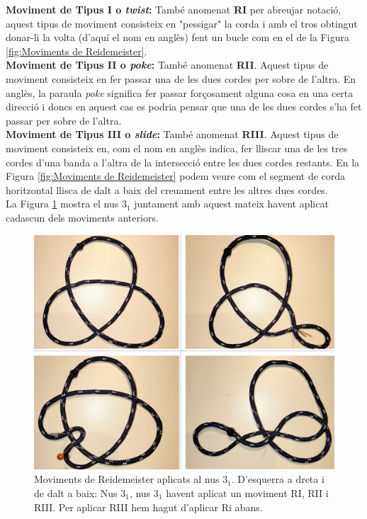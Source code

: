 \noindent
\textbf{Moviment de Tipus I o \textit{twist}:} També anomenat \textbf{RI} per abreujar notació, aquest tipus de moviment consisteix en "pessigar" la corda i amb el tros obtingut donar-li la volta (d'aquí el nom en anglès) fent un bucle com en el de la Figura \ref{fig:Moviments de Reidemeister}.\\

\noindent
\textbf{Moviment de Tipus II o \textit{poke}:} També anomenat \textbf{RII}. Aquest tipus de moviment consisteix en fer passar una de les dues cordes per sobre de l'altra. En anglès, la paraula \textit{poke} significa fer passar forçosament alguna cosa en una certa direcció i doncs en aquest cas es podria pensar que una de les dues cordes s'ha fet passar per sobre de l'altra.\\

\noindent
\textbf{Moviment de Tipus III o \textit{slide}:} També anomenat \textbf{RIII}. Aquest tipus de moviment consisteix en, com el nom en anglès indica, fer lliscar una de les tres cordes d'una banda a l'altra de la intersecció entre les dues cordes restants. En la Figura \ref{fig:Moviments de Reidemeister} podem veure com el segment de corda horitzontal llisca de dalt a baix del creuament entre les altres dues cordes.\\

La Figura \ref{fig:movimentsdereidemeisteraltrefoil} mostra el nus $3_1$ juntament amb aquest mateix havent aplicat cadascun dels moviments anteriors.

\begin{figure}
	\centering
	\includegraphics[width=\linewidth]{img/moviments de reidemeister (2).jpg}
	\caption{Moviments de Reidemeister aplicats al nus $3_1$. D'esquerra a dreta i de dalt a baix: Nus $3_1$, nus $3_1$ havent aplicat un moviment RI, RII i RIII. Per aplicar RIII hem hagut d'aplicar Ri abans.}\label{fig:movimentsdereidemeisteraltrefoil}
\end{figure}

